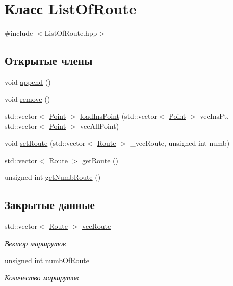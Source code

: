 \hypertarget{class_list_of_route}{}\section{Класс List\+Of\+Route}
\label{class_list_of_route}


{\ttfamily \#include $<$List\+Of\+Route.\+hpp$>$}

\subsection*{Открытые члены}
\begin{DoxyCompactItemize}
\item 
void \hyperlink{class_list_of_route_aca86b8d0f7fba0bb385a413c99b58349}{append} ()
\item 
void \hyperlink{class_list_of_route_a9ab504d6178a62aa6275cc939b30271a}{remove} ()
\item 
std\+::vector$<$ \hyperlink{class_point}{Point} $>$ \hyperlink{class_list_of_route_a5435d2b51f4c648660085d31585e7992}{load\+Ins\+Point} (std\+::vector$<$ \hyperlink{class_point}{Point} $>$ vec\+Ins\+Pt, std\+::vector$<$ \hyperlink{class_point}{Point} $>$ vec\+All\+Point)
\item 
void \hyperlink{class_list_of_route_ae2617f671931e16d615207e6f5f38637}{set\+Route} (std\+::vector$<$ \hyperlink{class_route}{Route} $>$ \+\_\+vec\+Route, unsigned int numb)
\item 
std\+::vector$<$ \hyperlink{class_route}{Route} $>$ \hyperlink{class_list_of_route_a6edac6551e5204b276c20f7c6c6e150e}{get\+Route} ()
\item 
unsigned int \hyperlink{class_list_of_route_a78901ad87a76124ca3bfddaedce21aab}{get\+Numb\+Route} ()
\end{DoxyCompactItemize}
\subsection*{Закрытые данные}
\begin{DoxyCompactItemize}
\item 
std\+::vector$<$ \hyperlink{class_route}{Route} $>$ \hyperlink{class_list_of_route_a43e18a19f3c0b5035c653c6588b28562}{vec\+Route}
\begin{DoxyCompactList}\small\item\em Вектор маршрутов \end{DoxyCompactList}\item 
unsigned int \hyperlink{class_list_of_route_a44c37a17d5c6a3ed3d21efd55b337a0f}{numb\+Of\+Route}
\begin{DoxyCompactList}\small\item\em Количество маршрутов \end{DoxyCompactList}\end{DoxyCompactItemize}


